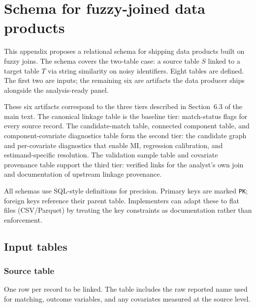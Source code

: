 

\section{Schema for fuzzy-joined data products}

This appendix proposes a relational schema for shipping data products built on fuzzy joins. The schema covers the two-table case: a source table $S$ linked to a target table $T$ via string similarity on noisy identifiers. Eight tables are defined. The first two are inputs; the remaining six are artifacts the data producer ships alongside the analysis-ready panel.

These six artifacts correspond to the three tiers described in Section~6.3 of the main text. The canonical linkage table is the baseline tier: match-status flags for every source record. The candidate-match table, connected component table, and component-covariate diagnostics table form the second tier: the candidate graph and per-covariate diagnostics that enable MI, regression calibration, and estimand-specific resolution. The validation sample table and covariate provenance table support the third tier: verified links for the analyst's own join and documentation of upstream linkage provenance.

All schemas use SQL-style definitions for precision. Primary keys are marked \texttt{PK}; foreign keys reference their parent table. Implementers can adapt these to flat files (CSV/Parquet) by treating the key constraints as documentation rather than enforcement.

\subsection{Input tables}

\subsubsection{Source table}

One row per record to be linked. The table includes the raw reported name used for matching, outcome variables, and any covariates measured at the source level.

